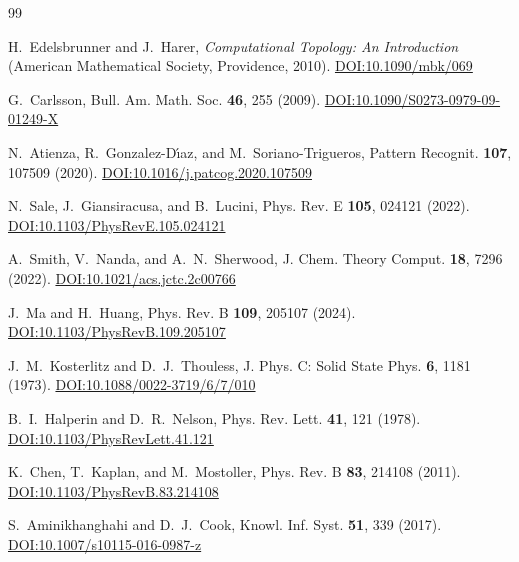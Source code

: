 \documentclass[twocolumn,showpacs,preprintnumbers,amsmath,amssymb,prb,floatfix]{revtex4-2}
\begin{document}
\begin{thebibliography}{99}
\raggedright %

H.~Edelsbrunner and J.~Harer, \textit{Computational Topology: An Introduction} (American Mathematical Society, Providence, 2010). \href{https://doi.org/10.1090/mbk/069}{DOI:10.1090/mbk/069}

G.~Carlsson, Bull. Am. Math. Soc. \textbf{46}, 255 (2009). \href{https://doi.org/10.1090/S0273-0979-09-01249-X}{DOI:10.1090/S0273-0979-09-01249-X}

N.~Atienza, R.~Gonzalez-D\'{\i}az, and M.~Soriano-Trigueros, Pattern Recognit. \textbf{107}, 107509 (2020). \href{https://doi.org/10.1016/j.patcog.2020.107509}{DOI:10.1016/j.patcog.2020.107509}

N.~Sale, J.~Giansiracusa, and B.~Lucini, Phys. Rev. E \textbf{105}, 024121 (2022). \href{https://doi.org/10.1103/PhysRevE.105.024121}{DOI:10.1103/PhysRevE.105.024121}

A.~Smith, V.~Nanda, and A.~N.~Sherwood, J. Chem. Theory Comput. \textbf{18}, 7296 (2022). \href{https://doi.org/10.1021/acs.jctc.2c00766}{DOI:10.1021/acs.jctc.2c00766}

J.~Ma and H.~Huang, Phys. Rev. B \textbf{109}, 205107 (2024). \href{https://doi.org/10.1103/PhysRevB.109.205107}{DOI:10.1103/PhysRevB.109.205107}

J.~M.~Kosterlitz and D.~J.~Thouless, J. Phys. C: Solid State Phys. \textbf{6}, 1181 (1973). \href{https://doi.org/10.1088/0022-3719/6/7/010}{DOI:10.1088/0022-3719/6/7/010}

B.~I.~Halperin and D.~R.~Nelson, Phys. Rev. Lett. \textbf{41}, 121 (1978). \href{https://doi.org/10.1103/PhysRevLett.41.121}{DOI:10.1103/PhysRevLett.41.121}

K.~Chen, T.~Kaplan, and M.~Mostoller, Phys. Rev. B \textbf{83}, 214108 (2011). \href{https://doi.org/10.1103/PhysRevB.83.214108}{DOI:10.1103/PhysRevB.83.214108}

S.~Aminikhanghahi and D.~J.~Cook, Knowl. Inf. Syst. \textbf{51}, 339 (2017). \href{https://doi.org/10.1007/s10115-016-0987-z}{DOI:10.1007/s10115-016-0987-z}


\end{thebibliography}
\end{document}
